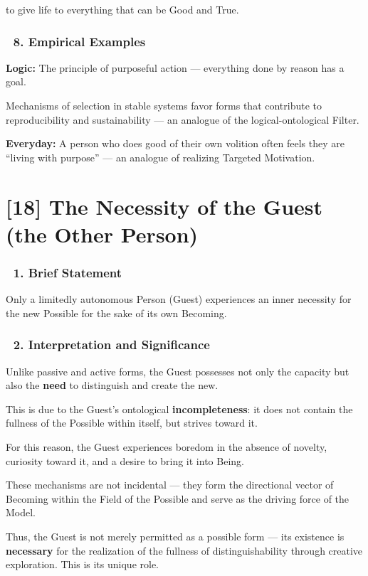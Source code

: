 \documentclass[12pt]{article}
\begin{document}
to give life to everything that can be Good and True.

\subsubsection*{🔹 8. Empirical Examples}

\textbf{Logic:} The principle of purposeful action — everything done by reason has a goal.

Mechanisms of selection in stable systems favor forms that contribute to reproducibility and sustainability — an analogue of the logical-ontological Filter.

\textbf{Everyday:} A person who does good of their own volition often feels they are ``living with purpose'' — an analogue of realizing Targeted Motivation.


\section*{[18] The Necessity of the Guest (the Other Person)}

\subsubsection*{🔹 1. Brief Statement}

Only a limitedly autonomous Person (Guest) experiences an inner necessity for the new Possible for the sake of its own Becoming.

\subsubsection*{🔹 2. Interpretation and Significance}

Unlike passive and active forms, the Guest possesses not only the capacity but also the \textbf{need} to distinguish and create the new.

This is due to the Guest’s ontological \textbf{incompleteness}: it does not contain the fullness of the Possible within itself, but strives toward it.

For this reason, the Guest experiences boredom in the absence of novelty, curiosity toward it, and a desire to bring it into Being.

These mechanisms are not incidental — they form the directional vector of Becoming within the Field of the Possible and serve as the driving force of the Model.

Thus, the Guest is not merely permitted as a possible form — its existence is \textbf{necessary} for the realization of the fullness of distinguishability through creative exploration. This is its unique role.
\end{document}
